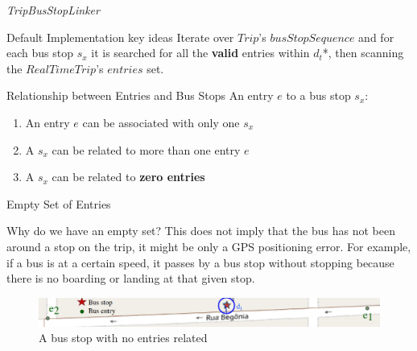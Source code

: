 \documentclass[xcolor=dvipsnames,table]{beamer}
\begin{document}
\begin{frame}{\textit{TripBusStopLinker}}
        \begin{block}{Default Implementation key ideas}
                Iterate over $Trip$'s $busStopSequence$
                and for each bus stop $s_x$ it is searched for all the \textbf{valid} entries within $d_t$*, then scanning the $RealTimeTrip$'s $entries$ set.
        \end{block}
        \begin{block}{Relationship between Entries and Bus Stops}
                An entry $e$ to a bus stop $s_x$:
                \begin{enumerate}
                        \item An entry $e$ can be associated with only one $s_x$
                        \item A $s_x$ can be related to more than one entry $e$
                        \item A $s_x$ can be related to \textbf{zero entries}
                \end{enumerate}
        \end{block}
\end{frame}
\begin{frame}{Empty Set of Entries}
        \begin{block}{Why do we have an empty set?}
                This does not imply that the bus has not been around a stop on the trip, 
                it might be only a GPS positioning error. For example, if a bus is at a
                certain speed, it passes by a bus stop without stopping because there
                is no boarding or landing at that given stop.
        \end{block}
        \begin{figure}[h]
                \centering
                \caption{A bus stop with no entries related}
                \includegraphics[width=\textwidth]{images/9202_empty_set.png}
        \end{figure}
\end{frame}
\end{document}
